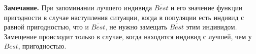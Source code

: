 \textbf{Замечание.} При запоминании лучшего индивида $ \overline{Best} $ и его значение функции пригодности в случае наступления ситуации, когда в популяции есть индивид с равной пригодностью, что и $ \overline{Best} $, не нужно замещать $ \overline{Best} $ этим индивидом. Замещение происходит только в случае, когда находится индивид с лучшей, чем у $ \overline{Best} $, пригодностью.

\clearpage